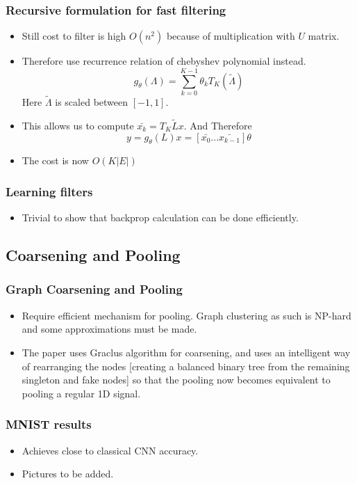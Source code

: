 \documentclass{beamer}
\begin{document}
\begin{frame}
  \frametitle{Recursive formulation for fast filtering}
  \begin{itemize}
  \item Still cost to filter is high $O(n^2)$ because of multiplication with $U$ matrix.
  \item Therefore use recurrence relation of chebyshev polynomial instead.
    $$g_{\theta}(\Lambda) = \sum_{k=0}^{K-1}\theta_k T_K(\tilde{\Lambda})$$
    Here $\tilde{\Lambda}$ is scaled between $[-1,1]$.
  \item This allows us to compute $\bar{x_k} = T_K{\tilde{L}}x$. And Therefore
    $$ y = g_{\theta}(L)x = [\bar{x_0}...\bar{x_{k-1}}]\theta$$
  \item The cost is now $O(K|E|)$
  \end{itemize}
\end{frame}

\begin{frame}
  \frametitle{Learning filters}
  \begin{itemize}
  \item Trivial to show that backprop calculation can be done efficiently.
  \end{itemize}
\end{frame}

\subsection{Coarsening and Pooling}
\begin{frame}
  \frametitle{Graph Coarsening and Pooling}
  \begin{itemize}
  \item Require efficient mechanism for pooling. Graph clustering as such is NP-hard and some approximations must be made.
  \item The paper uses Graclus algorithm for coarsening, and uses an intelligent way of rearranging the nodes [creating a balanced binary tree from the remaining singleton and fake nodes] so that the pooling now becomes equivalent to pooling a regular 1D signal.
  \end{itemize}
\end{frame}

\begin{frame}
  \frametitle{MNIST results}
  \begin{itemize}
  \item Achieves close to classical CNN accuracy.
  \item Pictures to be added.
  \end{itemize}
\end{frame}
\end{document}
